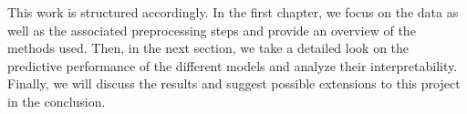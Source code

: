 This work is structured accordingly.
In the first chapter, we focus on the data as well as the associated preprocessing steps and provide an overview of the methods used.
Then, in the next section, we take a detailed look on the predictive performance of the different models and analyze their interpretability.
Finally, we will discuss the results and suggest possible extensions to this project in the conclusion.

























